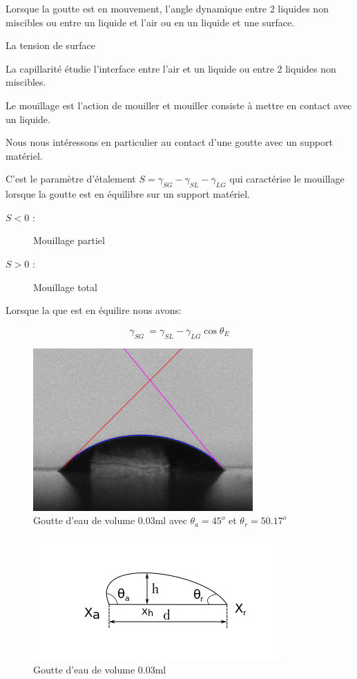 \documentclass[french]{article}
\begin{document}
Lorsque la goutte est en mouvement, l'angle dynamique   entre 2 liquides non miscibles ou entre un liquide et l'air ou en un liquide et une surface.

La tension de surface 

La capillarité étudie l'interface entre l'air et un liquide ou entre 2 liquides
non miscibles.

Le mouillage est l'action de mouiller et mouiller consiste à mettre en contact avec un liquide.

Nous nous intéressons en particulier au contact d'une goutte avec un support matériel.

C'est le paramètre d'étalement $S = \gamma_{SG} - \gamma_{SL} - \gamma_{LG}$ qui caractérise le mouillage lorsque la goutte est en équilibre sur un support matériel.

\begin{description}
\item[$S < 0$ :] Mouillage partiel
\item[$S > 0$ :] Mouillage total
\end{description}

Lorsque la que est en équilire nous avons:

\[\gamma_{SG}\ = \gamma_{SL} - \gamma_{LG}\cos\theta_{E} \]

\begin{figure}[ht]
	\centering
	\includegraphics[scale = 0.6]{./image/crop_tvitesse=28_volume=003.png}
	\caption{Goutte d'eau de volume $0.03$ml avec $\theta_{a} = 45^{o}$ et $\theta_{r} = 50.17^{o}$}
\end{figure}

\begin{figure}[ht]
	\centering
	\includegraphics[scale = 0.6]{./image/rrgou.png}
	\caption{Goutte d'eau de volume $0.03$ml}
\end{figure}
\end{document}
